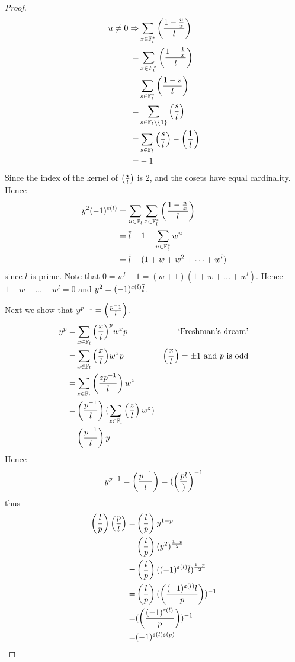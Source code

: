 \begin{proof}
\begin{align*}
        u \ne 0 \Rightarrow &\sum_{x \in \mathbb{F}_l^*} \left(\frac{1 - \frac{u}{x}}{l}\right)\\
            = &\sum_{x \in F_l^*} \left(\frac{1 - \frac{1}{x}}{l}\right)\\
            = &\sum_{s \in \mathbb{F}_l^*} \left(\frac{1 - s}{l}\right)\\
            = &\sum_{s \in \mathbb{F}_l \setminus \left\{1\right\}} \left(\frac{s}{l}\right)\\
            = &\sum_{s \in \mathbb{F}_l} \left(\frac{s}{l}\right) - \left(\frac{1}{l}\right)\\
            = & - 1 
    \end{align*}
    Since the index of the kernel of $\left(\frac{\star}{l}\right)$ is $2$,
    and the cosets have equal cardinality.
    Hence 
    \begin{align*}
        y^2 (-1)^{\varepsilon(l)} &= \sum_{u \in \mathbb{F}_l}  \sum_{x \in \mathbb{F}_l^*}
            \left(\frac{1 - \frac{u}{x}}{l}\right)\\
            &= \overline{l} - 1 - \sum_{u \in \mathbb{F}_l^*} w^u\\
            &= \overline{l} - (1 + w + w^2 + \dots + w^l)
    \end{align*}
    since $l$ is prime. 
    Note that $0 = w^l - 1 = (w+1)(1+w + \dots + w^l)$.
    Hence $1+w + \dots + w^l = 0$ and $y^2 = (-1)^{\varepsilon(l)} \overline{l}$.

    Next we show that $y^{p - 1} = \left(\frac{p^-1}{l}\right)$.
    \begin{align*}
        y^p = & \sum_{x \in \mathbb{F}_l} {\left(\frac{x}{l}\right)}^p w^xp & \text{ `Freshman's dream'}\\
            = & \sum_{x \in \mathbb{F}_l} {\left(\frac{x}{l}\right)} w^xp & 
            \left(\frac{x}{l}\right)= \pm 1 \text{ and } p \text{ is odd}\\
            = & \sum_{z \in \mathbb{F}_l} \left(\frac{z p^{-1}}{l}\right) w^z\\
            = & \left(\frac{p^{-1}}{l}\right)(\sum_{z \in \mathbb{F}_l} \left(\frac{z}{l}\right) w^z)\\
            = & \left(\frac{p^{-1}}{l}\right) y
    \end{align*}
    Hence \[y^{p - 1} = \left(\frac{p^{-1}}{l}\right) = (\left(\frac{p{l}}{)}\right)^{-1}\]
    thus 
    \begin{align*}
        \left(\frac{l}{p}\right)\left(\frac{p}{l}\right) =& \left(\frac{l}{p}\right) y^{1 - p}\\
        =& \left(\frac{l}{p}\right) (y^2)^{\frac{1 - p}{2}}\\
        =& \left(\frac{l}{p}\right) ((-1)^{\varepsilon(l)} \overline{l})^{\frac{1 - p}{2}}\\
        =& \left(\frac{l}{p}\right) (\left(\frac{(-1)^{\varepsilon(l)}l}{p}\right))^{-1}\\
        =& (\left(\frac{(-1)^{\varepsilon(l)}}{p}\right))^{-1}\\
        =& (-1)^{\varepsilon(l)\varepsilon(p)}
    \end{align*}
\end{proof}